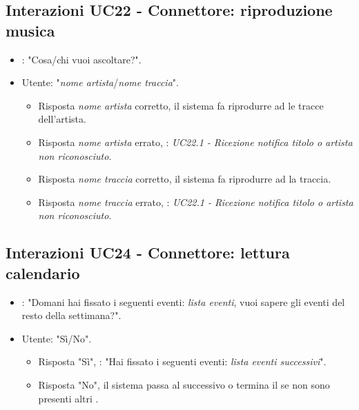 \subsection{Interazioni UC22 - Connettore: riproduzione musica}
\label{sec:connettore_musica}
 \begin{itemize}
        \item {}: "Cosa/chi vuoi ascoltare?".
        \item Utente: "{\it nome artista}/{\it nome traccia}".
        \begin{itemize}
         \item{Risposta {\it nome artista} corretto}, il sistema fa riprodurre ad  le tracce dell'artista.
        \item{Risposta {\it nome artista} errato}, :  {\it UC22.1 - Ricezione notifica titolo o artista non riconosciuto}.
        \item{Risposta {\it nome traccia} corretto}, il sistema fa riprodurre ad  la traccia.
        \item{Risposta {\it nome traccia} errato}, :  {\it UC22.1 - Ricezione notifica titolo o artista non riconosciuto}.
         \end{itemize}
    \end{itemize}


\subsection{Interazioni UC24 - Connettore: lettura calendario}
\label{sec:connettore_lettura_calendario}
\begin{itemize}
        \item {}: "Domani hai fissato i seguenti eventi: {\it lista eventi}, vuoi sapere gli eventi del resto della settimana?".
        \item Utente: "Sì/No".
        \begin{itemize}
         \item{Risposta "Sì"}, : "Hai fissato i seguenti eventi: {\it lista eventi successivi}".
         \item{Risposta "No"}, il sistema passa al  successivo o termina il  se non sono presenti altri .
         \end{itemize}
    \end{itemize}



